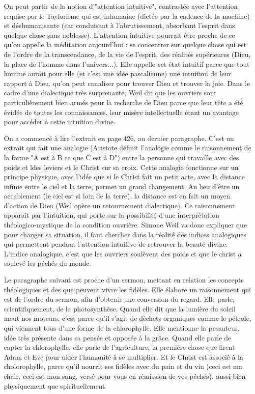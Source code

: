 \documentclass[a4paper,12pt]{book}
\begin{document}
\par On peut partir de la notion d'"attention intuitive", contrastée avec l'attention requise par le Taylorisme qui est inhumaine (dictée par la cadence de la machine) et déshumanisante (car conduisant à l'abrutissement, absorbant l'esprit dans quelque chose sans noblesse). L'attention intuitive pourrait être proche de ce qu'on appelle la méditation aujourd'hui : se concentrer sur quelque chose qui est de l'ordre de la transcendance, de la vie de l'esprit, des réalités supérieures (Dieu, la place de l'homme dans l'univers...). Elle appelle cet état intuitif parce que tout homme aurait pour elle (et c'est une idée pascalienne) une intuition de leur rapport à Dieu, qu'on peut canaliser pour trouver Dieu et trouver la joie. Dans le cadre d'une dialectique très surprenante, Weil dit que les ouvriers sont particulièrement bien armés pour la recherche de Dieu parce que leur tête a été évidée de toutes les connaissances, leur misère intellectuelle étant un avantage pour accéder à cette intuition divine.
\par On a commencé à lire l'extrait en page 426, au dernier paragraphe. C'est un extrait qui fait une analogie (Aristote définit l'analogie comme le raisonnement de la forme "A est à B ce que C est à D") entre la personne qui travaille avec des poids et ldes leviers et le Christ sur sa croix. Cette analogie fonctionne sur un principe physique, avec l'idée que si le Christ fait un petit acte, avec la distance infinie entre le ciel et la terre, permet un grand changement. Au lieu d'être un accablement (le ciel est si loin de la terre), la distance est en fait un moyen d'action de Dieu (Weil opère un retournement dialectique). Ce raisonnement apparaît par l'intuition, qui porte sur la possibilité d'une interprétation théologico-mystique de la condition ouvrière. Simone Weil va donc expliquer que pour changer sa situation, il faut chercher dans la réalité des indices analogiques qui permettent pendant l'attention intuitive de retrouver la beauté divine. L'indice analogique, c'est que les ouvriers soulèvent des poids et que le christ a soulevé les péchés du monde.
\par Le paragraphe suivant est proche d'un sermon, mettant en relation les concepts théologiques et des que peuvent vivre les fidèles. Elle élabore un raisonnement qui est de l'ordre du sermon, afin d'obtenir une conversion du regard. Elle parle, scientifiquement, de la photosynthèse. Quand elle dit que la lumière du soleil meut nos moteurs, c'est parce qu'il s'agit de déchets organiques comme le pétrole, qui viennent tous d'une forme de la chlorophylle. Elle mentionne la pesanteur, idée très présente dans sa pensée et opposée à la grâce. Quand elle parle de capter la chlorophylle, elle parle de l'agriculture, la première chose que firent Adam et Eve pour aider l'humanité à se multiplier. Et le Christ est associé à la cholorophylle, parce qu'il nourrit ses fidèles avec du pain et du vin (ceci est ma chair, ceci est mon sang, versé pour vous en rémission de vos péchés), aussi bien physiquement que spirituellement.
\end{document}
